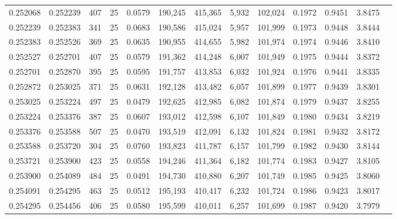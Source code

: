 \begin{tabular}{rrrrrrrrrrrrr}
0.252068 & 0.252239 &   407 &  25 &                                     0.0579 & 190,245 & 415,365 &   5,932 & 102,024 & 0.1972 & 0.9451 & 3.8475 \\
0.252239 & 0.252383 &   341 &  25 &                                     0.0683 & 190,586 & 415,024 &   5,957 & 101,999 & 0.1973 & 0.9448 & 3.8444 \\
0.252383 & 0.252526 &   369 &  25 &                                     0.0635 & 190,955 & 414,655 &   5,982 & 101,974 & 0.1974 & 0.9446 & 3.8410 \\
0.252527 & 0.252701 &   407 &  25 &                                     0.0579 & 191,362 & 414,248 &   6,007 & 101,949 & 0.1975 & 0.9444 & 3.8372 \\
0.252701 & 0.252870 &   395 &  25 &                                     0.0595 & 191,757 & 413,853 &   6,032 & 101,924 & 0.1976 & 0.9441 & 3.8335 \\
0.252872 & 0.253025 &   371 &  25 &                                     0.0631 & 192,128 & 413,482 &   6,057 & 101,899 & 0.1977 & 0.9439 & 3.8301 \\
0.253025 & 0.253224 &   497 &  25 &                                     0.0479 & 192,625 & 412,985 &   6,082 & 101,874 & 0.1979 & 0.9437 & 3.8255 \\
0.253224 & 0.253376 &   387 &  25 &                                     0.0607 & 193,012 & 412,598 &   6,107 & 101,849 & 0.1980 & 0.9434 & 3.8219 \\
0.253376 & 0.253588 &   507 &  25 &                                     0.0470 & 193,519 & 412,091 &   6,132 & 101,824 & 0.1981 & 0.9432 & 3.8172 \\
0.253588 & 0.253720 &   304 &  25 &                                     0.0760 & 193,823 & 411,787 &   6,157 & 101,799 & 0.1982 & 0.9430 & 3.8144 \\
0.253721 & 0.253900 &   423 &  25 &                                     0.0558 & 194,246 & 411,364 &   6,182 & 101,774 & 0.1983 & 0.9427 & 3.8105 \\
0.253900 & 0.254089 &   484 &  25 &                                     0.0491 & 194,730 & 410,880 &   6,207 & 101,749 & 0.1985 & 0.9425 & 3.8060 \\
0.254091 & 0.254295 &   463 &  25 &                                     0.0512 & 195,193 & 410,417 &   6,232 & 101,724 & 0.1986 & 0.9423 & 3.8017 \\
0.254295 & 0.254456 &   406 &  25 &                                     0.0580 & 195,599 & 410,011 &   6,257 & 101,699 & 0.1987 & 0.9420 & 3.7979 \\

\end{tabular}
